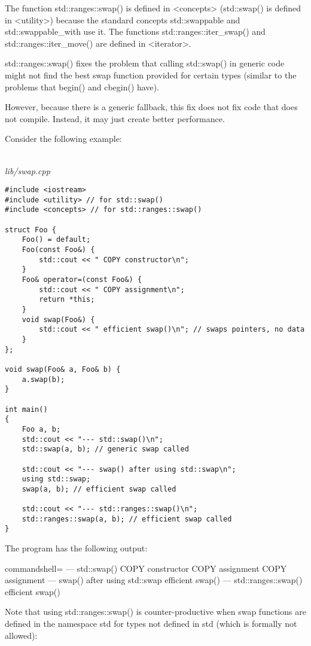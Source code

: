 The function std::ranges::swap() is defined in <concepts> (std::swap() is defined in <utility>) because the standard concepts std::swappable and std::swappable\_with use it. The functions std::ranges::iter\_swap() and std::ranges::iter\_move() are defined in <iterator>.

std::ranges::swap() fixes the problem that calling std::swap() in generic code might not find the best swap function provided for certain types (similar to the problems that begin() and cbegin() have).

However, because there is a generic fallback, this fix does not fix code that does not compile. Instead, it may just create better performance.

Consider the following example:

\noindent
\hspace*{\fill} \\ %
\textit{lib/swap.cpp}

\begin{lstlisting}[style=styleCXX]
#include <iostream>
#include <utility> // for std::swap()
#include <concepts> // for std::ranges::swap()

struct Foo {
	Foo() = default;
	Foo(const Foo&) {
		std::cout << " COPY constructor\n";
	}
	Foo& operator=(const Foo&) {
		std::cout << " COPY assignment\n";
		return *this;
	}
	void swap(Foo&) {
		std::cout << " efficient swap()\n"; // swaps pointers, no data
	}
};

void swap(Foo& a, Foo& b) {
	a.swap(b);
}

int main()
{
	Foo a, b;
	std::cout << "--- std::swap()\n";
	std::swap(a, b); // generic swap called
	
	std::cout << "--- swap() after using std::swap\n";
	using std::swap;
	swap(a, b); // efficient swap called
	
	std::cout << "--- std::ranges::swap()\n";
	std::ranges::swap(a, b); // efficient swap called
}
\end{lstlisting}

The program has the following output:

{\footnotesize
\begin{tcblisting}{commandshell={}}
--- std::swap()
COPY constructor
COPY assignment
COPY assignment
--- swap() after using std::swap
efficient swap()
--- std::ranges::swap()
efficient swap()
\end{tcblisting}
}

Note that using std::ranges::swap() is counter-productive when swap functions are defined in the namespace std for types not defined in std (which is formally not allowed):


